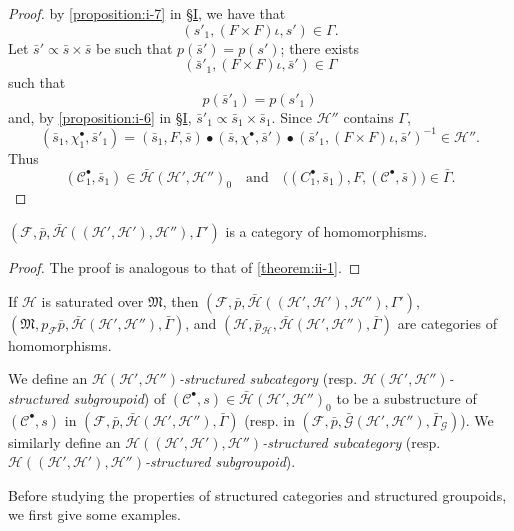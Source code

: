 \documentclass[a4paper,fleqn]{article}
\theoremstyle{plain}
\newenvironment{theorem}[1]
  {\renewcommand\theinnertheorem{#1}\innertheorem}
  {\endinnertheorem}
\theoremstyle{definition}
\newenvironment{definition}[1]
  {\renewcommand\theinnerdefinition{#1}\innerdefinition}
  {\endinnerdefinition}
\newcommand{\oldpage}[1]{{\marginpar{\footnotesize$\bigg\vert$\,\,\,\,\textit{p.~#1}}}}
\newcommand{\textand}{\quad\text{and}\quad}
\newcommand{\CC}{\mathcal{C}}
\newcommand{\HH}{\mathcal{H}}
\newcommand{\bHH}{\bar{\HH}}
\newcommand{\MM}{\mathfrak{M}}
\newcommand{\FF}{\mathcal{F}}
\newcommand{\subs}{\mathrel{\propto}}
\newcommand{\GG}{\mathcal{G}}
\begin{document}
\begin{proof}
  by \cref{proposition:i-7} in \hyperref[section:i]{§I}, we have that
  \[
    (s'_1,(F\times F)\iota,s')
    \in\Gamma.
  \]
  Let $\bar{s}'\subs\bar{s}\times\bar{s}$ be such that $p(\bar{s}')=p(s')$;
  there exists
  \[
    (\bar{s}'_1,(F\times F)\iota,\bar{s}')
    \in\Gamma
  \]
  such that
  \[
    p(\bar{s}'_1)
    = p(s'_1)
  \]
  and, by \cref{proposition:i-6} in \hyperref[section:i]{§I}, $\bar{s}'_1\subs\bar{s}_1\times\bar{s}_1$.
  Since $\HH''$ contains $\Gamma$,
  \[
    (\bar{s}_1,\chi_1^\bullet,\bar{s}'_1)
    = (\bar{s}_1,F,\bar{s})
    \bullet (\bar{s},\chi^\bullet,\bar{s}')
    \bullet(\bar{s}'_1,(F\times F)\iota,\bar{s}')^{-1}
    \in\HH''.
  \]
  Thus
  \[
    (\CC_1^\bullet,\bar{s}_1)
    \in\bHH(\HH',\HH'')_0
    \textand
    \big(
      (C_1^\bullet,\bar{s}_1), F, (\CC^\bullet,\bar{s})
    \big)
    \in\bar{\Gamma}.
  \]
\end{proof}

\oldpage{386}

\begin{theorem}{2}
\label{theorem:ii-2}
  $(\FF,\bar{p},\bHH((\HH',\HH'),\HH''),\Gamma')$ is a category of homomorphisms.
\end{theorem}

\begin{proof}
  The proof is analogous to that of \cref{theorem:ii-1}.
\end{proof}

\begin{theorem}{3}
\label{theorem:ii-3}
  If $\HH$ is saturated over $\MM$, then $(\FF,\bar{p},\bHH((\HH',\HH'),\HH''),\Gamma')$, $(\MM,p_\FF\bar{p},\bHH(\HH',\HH''),\bar{\Gamma})$, and $(\HH,\bar{p}_\HH,\bHH(\HH',\HH''),\bar{\Gamma})$ are categories of homomorphisms.
\end{theorem}

\begin{definition}{6}
\label{definition:ii-6}
  We define an \emph{$\HH(\HH',\HH'')$-structured subcategory} (resp. \emph{$\HH(\HH',\HH'')$-structured subgroupoid}) of $(\CC^\bullet,s)\in\bHH(\HH',\HH'')_0$ to be a substructure of $(\CC^\bullet,s)$ in $(\FF,\bar{p},\bHH(\HH',\HH''),\bar{\Gamma})$ (resp. in $(\FF,\bar{p},\bar{\GG}(\HH',\HH''),\bar{\Gamma}_\GG)$).
  We similarly define an \emph{$\HH((\HH',\HH'),\HH'')$-structured subcategory} (resp. \emph{$\HH((\HH',\HH'),\HH'')$-structured subgroupoid}).
\end{definition}

Before studying the properties of structured categories and structured groupoids, we first give some examples.
\end{document}
